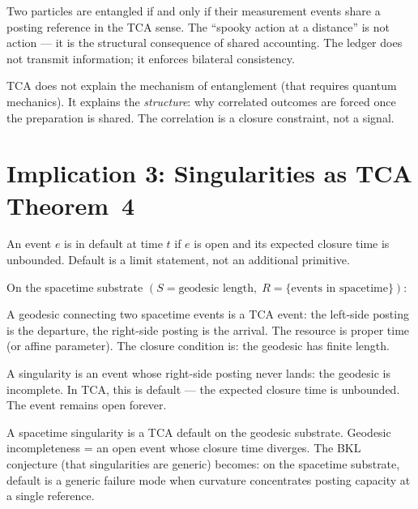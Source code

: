 \documentclass[11pt]{article}
\begin{document}
\begin{proposition}
Two particles are entangled if and only if their measurement events
share a posting reference in the TCA sense. The ``spooky action at
a distance'' is not action --- it is the structural consequence of
shared accounting. The ledger does not transmit information; it
enforces bilateral consistency.
\end{proposition}

\begin{remark}
TCA does not explain the mechanism of entanglement (that requires
quantum mechanics). It explains the \emph{structure}: why correlated
outcomes are forced once the preparation is shared. The correlation
is a closure constraint, not a signal.
\end{remark}

\section{Implication 3: Singularities as TCA Theorem~4}

\begin{theorem}
An event $e$ is in default at time $t$ if $e$ is open and its
expected closure time is unbounded. Default is a limit statement,
not an additional primitive.
\end{theorem}

On the spacetime substrate $(S = \text{geodesic length},\;
R = \{\text{events in spacetime}\})$:

A geodesic connecting two spacetime events is a TCA event: the
left-side posting is the departure, the right-side posting is the
arrival. The resource is proper time (or affine parameter). The
closure condition is: the geodesic has finite length.

A singularity is an event whose right-side posting never lands:
the geodesic is incomplete. In TCA, this is default --- the expected
closure time is unbounded. The event remains open forever.

\begin{proposition}
A spacetime singularity is a TCA default on the geodesic substrate.
Geodesic incompleteness = an open event whose closure time diverges.
The BKL conjecture (that singularities are generic) becomes: on the
spacetime substrate, default is a generic failure mode when curvature
concentrates posting capacity at a single reference.
\end{proposition}
\end{document}

